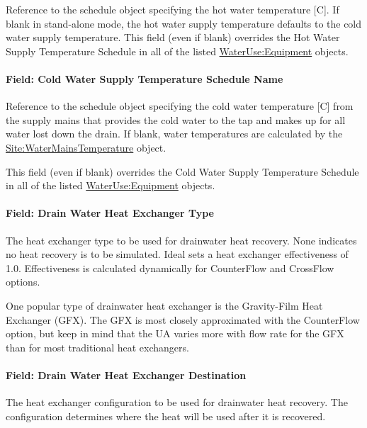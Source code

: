 Reference to the schedule object specifying the hot water temperature {[}C{]}. If blank in stand-alone mode, the hot water supply temperature defaults to the cold water supply temperature. This field (even if blank) overrides the Hot Water Supply Temperature Schedule in all of the listed \hyperref[wateruseequipment]{WaterUse:Equipment} objects.

\paragraph{Field: Cold Water Supply Temperature Schedule Name}\label{field-cold-water-supply-temperature-schedule-name-1-000}

Reference to the schedule object specifying the cold water temperature {[}C{]} from the supply mains that provides the cold water to the tap and makes up for all water lost down the drain. If blank, water temperatures are calculated by the \hyperref[sitewatermainstemperature]{Site:WaterMainsTemperature} object.

This field (even if blank) overrides the Cold Water Supply Temperature Schedule in all of the listed \hyperref[wateruseequipment]{WaterUse:Equipment} objects.

\paragraph{Field: Drain Water Heat Exchanger Type}\label{field-drain-water-heat-exchanger-type}

The heat exchanger type to be used for drainwater heat recovery. None indicates no heat recovery is to be simulated. Ideal sets a heat exchanger effectiveness of 1.0. Effectiveness is calculated dynamically for CounterFlow and CrossFlow options.

One popular type of drainwater heat exchanger is the Gravity-Film Heat Exchanger (GFX). The GFX is most closely approximated with the CounterFlow option, but keep in mind that the UA varies more with flow rate for the GFX than for most traditional heat exchangers.

\paragraph{Field: Drain Water Heat Exchanger Destination}\label{field-drain-water-heat-exchanger-destination}

The heat exchanger configuration to be used for drainwater heat recovery. The configuration determines where the heat will be used after it is recovered.

